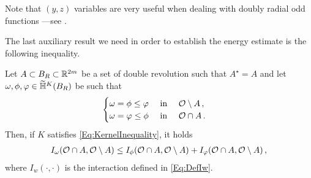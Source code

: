Note that $(y,z)$ variables are very useful when dealing with doubly radial odd functions ---see \cite{CabreTerraI, CabreTerraII, Cabre-Saddle, Cinti-Saddle,Cinti-Saddle2, Felipe-Sanz-Perela:SaddleFractional}.

The last auxiliary result we need in order to establish the energy estimate is the following inequality.

\begin{lemma}
\label{Lemma: InteractionInequalityMinimumFunction}
Let $A\subset B_R \subset \mathbb{R}^{2m}$ be a set of double revolution such that $A^\star = A$ and let $\omega, \phi, \varphi \in \widetilde{\mathbb{H}}^K(B_R)$ be such that
$$\begin{cases}
\omega = \phi \leq \varphi \ \ \ \ \textrm{in } \ \ \ \mathcal{O} \setminus A\,,\\
\omega = \varphi \leq \phi \ \ \ \ \textrm{in } \ \ \ \mathcal{O} \cap A\,.
\end{cases}$$
Then, if $K$ satisfies \eqref{Eq:KernelInequality}, it holds
\begin{align*}
I_\omega(\mathcal{O}\cap A, \mathcal{O} \setminus A) \leq I_\phi(\mathcal{O}\cap A, \mathcal{O} \setminus A) + I_\varphi(\mathcal{O}\cap A, \mathcal{O} \setminus A)\,,
\end{align*}
where $I_w(\cdot, \cdot)$ is the interaction defined in \eqref{Eq:DefIw}.
\end{lemma}

